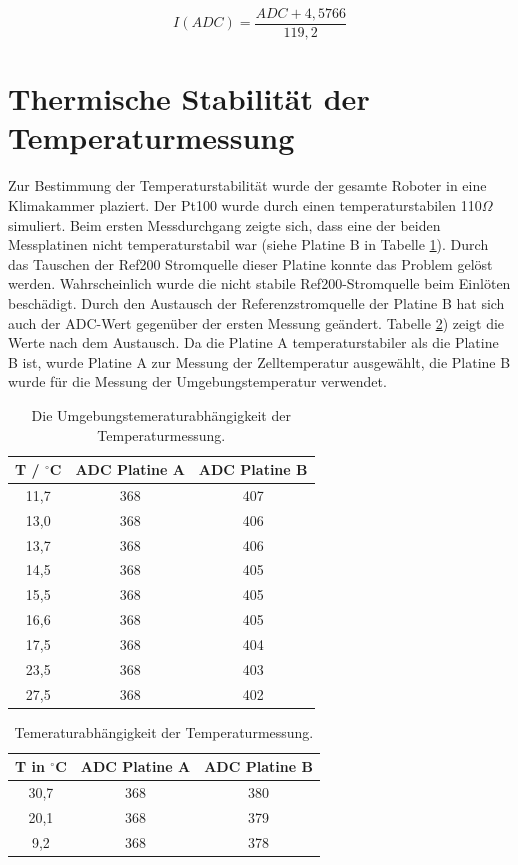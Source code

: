 \documentclass[a4paper,bibtotoc,oneside]{scrbook}
\begin{document}
\begin{equation}
     I(ADC) = \frac{ADC + 4,5766} {119,2} 
\end{equation}
  


\section{Thermische Stabilität der Temperaturmessung}\thispagestyle{empty}
Zur Bestimmung der Temperaturstabilität wurde der gesamte Roboter in eine Klimakammer plaziert. Der Pt100 wurde durch einen temperaturstabilen 110$\Omega$ simuliert.
Beim ersten Messdurchgang zeigte sich, dass eine der beiden Messplatinen nicht temperaturstabil war (siehe Platine B in Tabelle \ref{TabT1}). Durch das Tauschen der Ref200 Stromquelle dieser Platine konnte das Problem gelöst werden. Wahrscheinlich wurde die nicht stabile Ref200-Stromquelle beim Einlöten beschädigt. Durch den Austausch der Referenzstromquelle der Platine B hat sich auch der ADC-Wert gegenüber der ersten Messung geändert. Tabelle \ref{TabT2}) zeigt die Werte nach dem Austausch.
Da die Platine A temperaturstabiler als die Platine B ist, wurde Platine A zur Messung der Zelltemperatur ausgewählt, die Platine B wurde für die Messung der Umgebungstemperatur verwendet. 

\begin{table}[htbp]
\centering
\begin{tabular}{ | c | c | c |}\hline
{\bf T / $^{\circ}$C} & {\bf ADC Platine A} & {\bf ADC Platine B}\\ \hline
\hline
11,7 & 368 & 407\\ \hline
13,0 & 368 & 406\\ \hline
13,7 & 368 & 406\\ \hline
14,5 & 368 & 405\\ \hline
15,5 & 368 & 405\\ \hline
16,6 & 368 & 405\\ \hline
17,5 & 368 & 404\\ \hline
23,5 & 368 & 403\\ \hline
27,5 & 368 & 402\\ \hline
\end{tabular}
\caption{Die Umgebungstemeraturabhängigkeit der Temperaturmessung.}\label{TabT1}
\end{table}

\begin{table}[htbp]
\centering
\begin{tabular}{ | c | c | c |}\hline
{\bf T in $^{\circ}$C} & {\bf ADC Platine A} & {\bf ADC Platine B}\\ \hline
\hline
30,7 & 368 & 380\\ \hline
20,1 & 368 & 379\\ \hline
9,2 & 368 & 378\\ \hline
\end{tabular}
\caption{Temeraturabhängigkeit der Temperaturmessung.}\label{TabT2}
\end{table}
\end{document}
